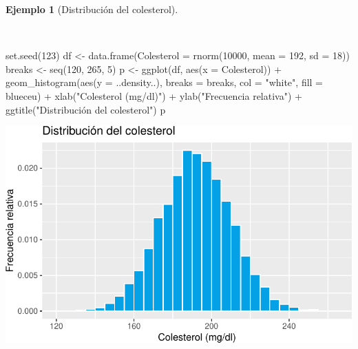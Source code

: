 \documentclass[
  a4paper,
]{scrreport}
\newenvironment{Shaded}{\begin{snugshade}}{\end{snugshade}}
\newcommand{\AttributeTok}[1]{\textcolor[rgb]{0.40,0.45,0.13}{#1}}
\newcommand{\DecValTok}[1]{\textcolor[rgb]{0.68,0.00,0.00}{#1}}
\newcommand{\FunctionTok}[1]{\textcolor[rgb]{0.28,0.35,0.67}{#1}}
\newcommand{\NormalTok}[1]{\textcolor[rgb]{0.00,0.23,0.31}{#1}}
\newcommand{\OtherTok}[1]{\textcolor[rgb]{0.00,0.23,0.31}{#1}}
\newcommand{\SpecialCharTok}[1]{\textcolor[rgb]{0.37,0.37,0.37}{#1}}
\newcommand{\StringTok}[1]{\textcolor[rgb]{0.13,0.47,0.30}{#1}}
\theoremstyle{plain}
\theoremstyle{definition}
\newtheorem{example}{Ejemplo}[chapter]
\theoremstyle{definition}
\theoremstyle{remark}
\begin{document}
\begin{example}[Distribución del
colesterol]\protect\hypertarget{exm-distribucion-colesterol}{}\label{exm-distribucion-colesterol}

~

\begin{Shaded}
\begin{Highlighting}[]
\FunctionTok{set.seed}\NormalTok{(}\DecValTok{123}\NormalTok{)}
\NormalTok{df }\OtherTok{\textless{}{-}} \FunctionTok{data.frame}\NormalTok{(}\AttributeTok{Colesterol =} \FunctionTok{rnorm}\NormalTok{(}\DecValTok{10000}\NormalTok{, }\AttributeTok{mean =} \DecValTok{192}\NormalTok{, }\AttributeTok{sd =} \DecValTok{18}\NormalTok{))}
\NormalTok{breaks }\OtherTok{\textless{}{-}} \FunctionTok{seq}\NormalTok{(}\DecValTok{120}\NormalTok{, }\DecValTok{265}\NormalTok{, }\DecValTok{5}\NormalTok{)}
\NormalTok{p }\OtherTok{\textless{}{-}} \FunctionTok{ggplot}\NormalTok{(df, }\FunctionTok{aes}\NormalTok{(}\AttributeTok{x =}\NormalTok{ Colesterol)) }\SpecialCharTok{+}
    \FunctionTok{geom\_histogram}\NormalTok{(}\FunctionTok{aes}\NormalTok{(}\AttributeTok{y =}\NormalTok{ ..density..), }\AttributeTok{breaks =}\NormalTok{ breaks, }\AttributeTok{col =} \StringTok{"white"}\NormalTok{, }\AttributeTok{fill =}\NormalTok{ blueceu) }\SpecialCharTok{+}
    \FunctionTok{xlab}\NormalTok{(}\StringTok{"Colesterol (mg/dl)"}\NormalTok{) }\SpecialCharTok{+}
    \FunctionTok{ylab}\NormalTok{(}\StringTok{"Frecuencia relativa"}\NormalTok{) }\SpecialCharTok{+}
    \FunctionTok{ggtitle}\NormalTok{(}\StringTok{"Distribución del colesterol"}\NormalTok{)}
\NormalTok{p}
\end{Highlighting}
\end{Shaded}

\includegraphics{02-estadistica-descriptiva_files/figure-pdf/histograma-colesterol-1.pdf}

\end{example}
\end{document}
